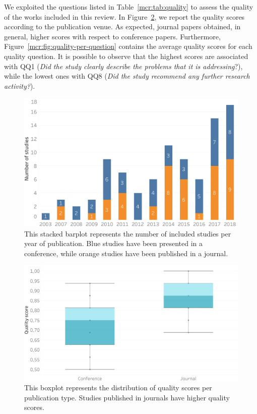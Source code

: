We exploited the questions listed in Table~\ref{mcr:tab:quality} to assess the quality of the works included in this review. In Figure~\ref{mcr:fig:quality-per-type}, we report the quality scores according to the publication venue. As expected, journal papers obtained, in general, higher scores with respect to conference papers. Furthermore, Figure~\ref{mcr:fig:quality-per-question} contains the average quality scores for each quality question. It is possible to observe that the highest scores are associated with QQ1 (\emph{Did the study clearly describe the problems that it is addressing}?), while the lowest ones with QQ8 (\emph{Did the study recommend any further research activity?}).

\begin{figure}
\centering
\includegraphics[width=\textwidth]{study_per_year}
\caption[Studies per year of publication]{This stacked barplot represents the number of included studies per year of publication. Blue studies have been presented in a conference, while orange studies have been published in a journal.}
\label{mcr:fig:study-per-year}
\end{figure}

\begin{figure}
\centering
\includegraphics[width=\textwidth]{quality_per_type}
\caption[Quality scores per publication type]{This boxplot represents the distribution of quality scores per publication type. Studies published in journals have higher quality scores.}
\label{mcr:fig:quality-per-type}
\end{figure}

